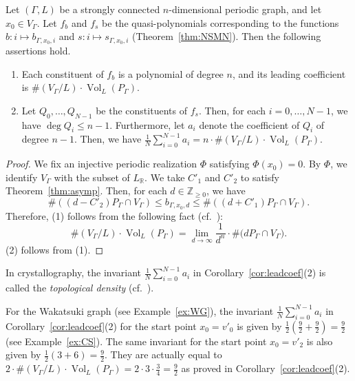 \documentclass[ALCO,published]{cedram}
\theoremstyle{remark}
\begin{document}
\begin{cor}[{\cite[Theorem 2]{SM20b}}]\label{cor:leadcoef}
Let $(\Gamma,L)$ be a strongly connected $n$-dimensional periodic graph, and let $x_0 \in V_{\Gamma}$.
Let $f_b$ and $f_s$ be the quasi-polynomials corresponding to the functions 
$b: i \mapsto b_{\Gamma, x_0, i}$ and $s: i \mapsto s_{\Gamma, x_0, i}$ (Theorem~\ref{thm:NSMN}). 
Then the following assertions hold. 
\begin{enumerate}
\item 
Each constituent of $f_b$ is a polynomial of degree $n$, and its leading coefficient is 
$\#(V_\Gamma/L) \cdot \operatorname{Vol}_L(P_\Gamma)$. 

\item 
Let $Q_0, \ldots , Q_{N-1}$ be the constituents of $f_s$. 
Then, for each $i = 0, \ldots, N-1$, we have $\deg Q_i \le n-1$. 
Furthermore, let $a_i$ denote the coefficient of $Q_i$ of degree $n-1$. 
Then, we have $\frac{1}{N}\sum _{i = 0}^{N-1} a_i = n \cdot \#(V_\Gamma/L) \cdot \operatorname{Vol}_L(P_\Gamma)$. 
\end{enumerate}
\end{cor}
\begin{proof}
We fix an injective periodic realization $\Phi$ satisfying $\Phi(x_0) = 0$. 
By $\Phi$, we identify $V_{\Gamma}$ with the subset of $L_{\mathbb{R}}$. 
We take $C' _1$ and $C' _2$ to satisfy Theorem~\ref{thm:asymp}. 
Then, for each $d \in \mathbb{Z}_{\ge 0}$, we have 
\[
\#((d-C' _2)P_\Gamma \cap V_\Gamma) \le b_{\Gamma, x_0, d} \le \#((d+C' _1)P_\Gamma \cap V_\Gamma). 
\]
Therefore, (1) follows from the following fact (cf.~\cite[Lemma 3.19]{BR}): 
\[
\#(V_\Gamma/L) \cdot \operatorname{Vol}_L (P_\Gamma) 
= \lim _{d \to \infty} \frac{1}{d^n} \cdot \# \bigl( d P_{\Gamma} \cap V_{\Gamma} \bigr). 
\]
(2) follows from (1). 
\end{proof}

\begin{rmk}
In crystallography, 
the invariant $\frac{1}{N}\sum _{i = 0}^{N-1} a_i$ in Corollary~\ref{cor:leadcoef}(2) 
is called the \textit{topological density} (cf.~\cite{GKBS96}). 
\end{rmk}

\begin{ex}
For the Wakatsuki graph (see Example~\ref{ex:WG}), 
the invariant $\frac{1}{N}\sum _{i = 0}^{N-1} a_i$ in Corollary~\ref{cor:leadcoef}(2) for the start point $x_0 = v'_0$ is given by 
$\frac{1}{2}\left( \frac{9}{2} + \frac{9}{2} \right) = \frac{9}{2}$ (see Example~\ref{ex:CS}). 
The same invariant for the start point $x_0 = v'_2$ is also given by $\frac{1}{2}(3 + 6) = \frac{9}{2}$. 
They are actually equal to $2 \cdot \#(V_\Gamma/L) \cdot \operatorname{Vol}_L (P_\Gamma) = 2 \cdot 3 \cdot \frac{3}{4} = \frac{9}{2}$ 
as proved in Corollary~\ref{cor:leadcoef}(2). 
\end{ex}
\end{document}
